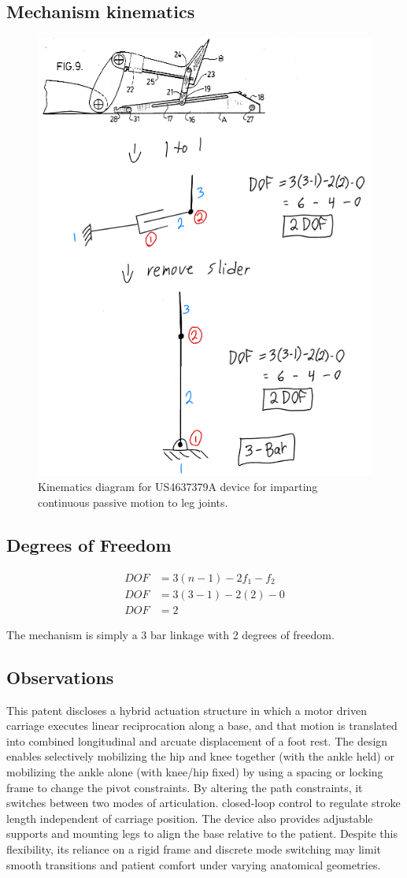 \documentclass[11pt]{article}
\begin{document}
\subsection{Mechanism kinematics}
\begin{figure}[H]
  \centering
  \includegraphics[width=0.54\linewidth]{../Kinematic Mechanism Images/4637379.png}
  \caption{Kinematics diagram for US4637379A device for imparting continuous passive motion to leg joints.}
  \label{fig:US4637379A_kinematics}
\end{figure}

\subsection{Degrees of Freedom}
\[
\begin{aligned}
DOF &= 3(n-1) - 2f_1 - f_2 \\
DOF &= 3(3-1) - 2(2) - 0 \\
DOF &= 2
\end{aligned}
\]

The mechanism is simply a 3 bar linkage with 2 degrees of freedom.

\subsection{Observations}
This patent discloses a hybrid actuation structure in which a motor driven carriage executes linear reciprocation along a base, and that motion is translated into combined longitudinal and arcuate displacement of a foot rest. The design enables selectively mobilizing the hip and knee together (with the ankle held) or mobilizing the ankle alone (with knee/hip fixed) by using a spacing or locking frame to change the pivot constraints. By altering the path constraints, it switches between two modes of articulation. closed-loop control to regulate stroke length independent of carriage position. The device also provides adjustable supports and mounting legs to align the base relative to the patient. Despite this flexibility, its reliance on a rigid frame and discrete mode switching may limit smooth transitions and patient comfort under varying anatomical geometries.
\end{document}
